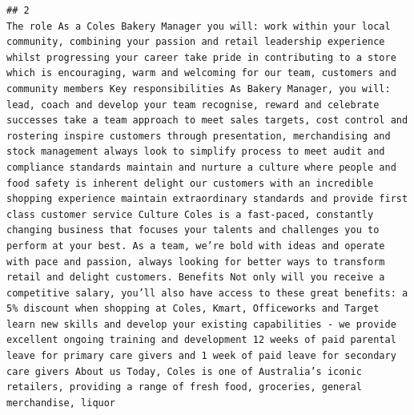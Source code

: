 \documentclass[11pt,a4paper,]{article}
\begin{document}
\begin{verbatim}
## 2                                                                                                                                                                                                                                                                                                                                                                                                                                                                                                                                                                                                                                                                                                                                                                                                                                                                                                                                                                                                                                                                                                                                                                                                                                                                                                                                                                                                                                                                                                                                                                                                                                                                                                                                        The role As a Coles Bakery Manager you will: work within your local community, combining your passion and retail leadership experience whilst progressing your career take pride in contributing to a store which is encouraging, warm and welcoming for our team, customers and community members Key responsibilities As Bakery Manager, you will: lead, coach and develop your team recognise, reward and celebrate successes take a team approach to meet sales targets, cost control and rostering inspire customers through presentation, merchandising and stock management always look to simplify process to meet audit and compliance standards maintain and nurture a culture where people and food safety is inherent delight our customers with an incredible shopping experience maintain extraordinary standards and provide first class customer service Culture Coles is a fast-paced, constantly changing business that focuses your talents and challenges you to perform at your best. As a team, we’re bold with ideas and operate with pace and passion, always looking for better ways to transform retail and delight customers. Benefits Not only will you receive a competitive salary, you’ll also have access to these great benefits: a 5% discount when shopping at Coles, Kmart, Officeworks and Target learn new skills and develop your existing capabilities - we provide excellent ongoing training and development 12 weeks of paid parental leave for primary care givers and 1 week of paid leave for secondary care givers About us Today, Coles is one of Australia’s iconic retailers, providing a range of fresh food, groceries, general merchandise, liquor 
\end{verbatim}
\end{document}
